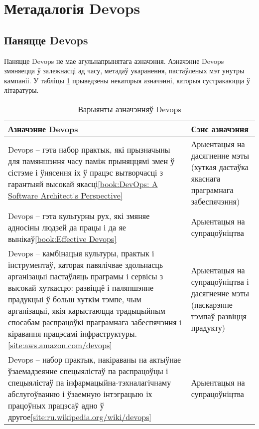 \section{Метадалогія Devops}

\subsection{Паняцце Devops}

Паняцце Devops не мае агульнапрынятага азначэння.
Азначэнне Devops змяняецца ў залежнасці ад часу, метадаў укаранення,
пастаўленых мэт унутры кампаніі.
У табліцы \ref{table:Definition of Devops} прыведзены некаторыя
азначэнні, каторыя сустракаюцца ў літаратуры.

\begin{table}[htbp]
    \caption{Варыянты азначэнняў Devops}
    \begin{tabular}{|p{}|p{}|} 
        \hline
        \textbf{Азначэнне Devops}
        &
        \textbf{Сэнс азначэння}  \\ 
        \hline
        Devops -- гэта набор практык, які прызначыны для
        памяншэння часу паміж прыняццямі змен ў сістэме і
        ўнясення іх ў працэс вытворчасці з гарантыяй
        высокай якасці\ref{book:DevOps: A Software Architect's Perspective}
        &
        Арыентацыя на дасягненне мэты (хуткая дастаўка
        якаснага праграмнага забеспячэння) \\ 
        \hline
        Devops -- гэта культурны рух, які змяняе адносіны людзей
        да працы і да яе вынікаў\ref{book:Effective Devops}
        & Арыентацыя на супрацоўніцтва \\ 
        \hline
        Devops -- камбінацыя культуры, практык і інструментаў,
        каторая павялічвае здольнасць арганізацыі
        пастаўляць праграмы і сервісы
        з высокай хуткасцю: развіццё і паляпшэнне прадукцыі
        ў больш хуткім тэмпе,
        чым арганізацыі, якія карыстаюцца традыцыйным спосабам распрацоўкі
        праграмнага забеспячэння і
        кіравання працэсамі інфраструктуры.\ref{site:aws.amazon.com/devops}
        & Арыентацыя на супрацоўніцтва і дасягненне мэты
        (паскарэнне тэмпаў развіцця прадукту) \\
        \hline
        Devops -- набор практык, накіраваны на актыўнае ўзаемадзеянне
        спецыялістаў па распрацоўцы і
        спецыялістаў па інфармацыйна-тэхналагічнаму
        абслугоўванню і ўзаемную інтэграцыю
        іх працоўных працэсаў
        адно ў другое\ref{site:ru.wikipedia.org/wiki/devops}
        &
        Арыентацыя на супрацоўніцтва \\
        \hline
    \end{tabular}
    \label{table:Definition of Devops}
\end{table}

